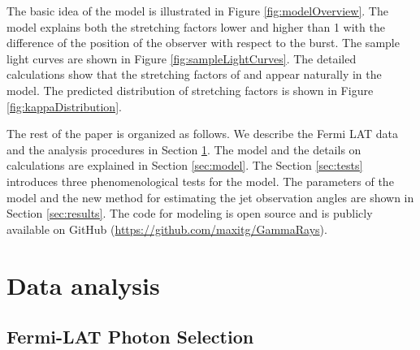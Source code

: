 \documentclass[manuscript]{aastex}
\begin{document}
The basic idea of the model is illustrated in Figure
\ref{fig:modelOverview}. The model explains both the stretching
factors lower and higher than 1 with the difference of the position of
the observer with respect to the burst. The sample light curves are
shown in Figure \ref{fig:sampleLightCurves}. The detailed calculations
show that the stretching factors of  and  appear
naturally in the model. The predicted distribution of stretching
factors is shown in Figure \ref{fig:kappaDistribution}.

The rest of the paper is organized as follows. We describe the Fermi
LAT data and the analysis procedures in Section
\ref{sec:observations}. The model and the details on calculations are
explained in Section \ref{sec:model}. The Section \ref{sec:tests}
introduces three phenomenological tests for the model. The parameters
of the model and the new method for estimating the jet observation
angles are shown in Section \ref{sec:results}. The code for modeling
is open source and is publicly available on GitHub
(\url{https://github.com/maxitg/GammaRays}).

\section{Data analysis}
\label{sec:observations}

\subsection{Fermi-LAT Photon Selection}
\label{sec:photonSelection}
\end{document}
